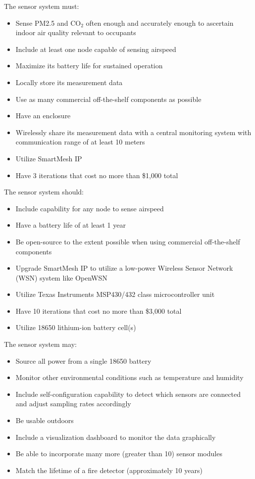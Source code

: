 The sensor system must:
\begin{itemize}[label=$\bullet$]
  \item Sense PM2.5 and CO$_2$ often enough and accurately enough to ascertain indoor air quality relevant to occupants
  \item Include at least one node capable of sensing airspeed
  \item Maximize its battery life for sustained operation
  \item Locally store its measurement data
  \item Use as many commercial off-the-shelf components as possible
  \item Have an enclosure
  \item Wirelessly share its measurement data with a central monitoring system with communication range of at least 10 meters
  \item Utilize SmartMesh IP
  \item Have 3 iterations that cost no more than \$1,000 total
\end{itemize}

The sensor system should:
\begin{itemize}[label=$\bullet$]
  \item Include capability for any node to sense airspeed
  \item Have a battery life of at least 1 year
  \item Be open-source to the extent possible when using commercial off-the-shelf components
  \item Upgrade SmartMesh IP to utilize a low-power Wireless Sensor Network (WSN) system like OpenWSN 
  \item Utilize Texas Instruments MSP430/432 class microcontroller unit
  \item Have 10 iterations that cost no more than \$3,000 total
  \item Utilize 18650 lithium-ion battery cell(s)
\end{itemize}

The sensor system may:
\begin{itemize}[label=$\bullet$]
  \item Source all power from a single 18650 battery
  \item Monitor other environmental conditions such as temperature and humidity
  \item Include self-configuration capability to detect which sensors are connected and adjust sampling rates accordingly
  \item Be usable outdoors
  \item Include a visualization dashboard to monitor the data graphically
  \item Be able to incorporate many more (greater than 10) sensor modules
  \item Match the lifetime of a fire detector (approximately 10 years)
\end{itemize}